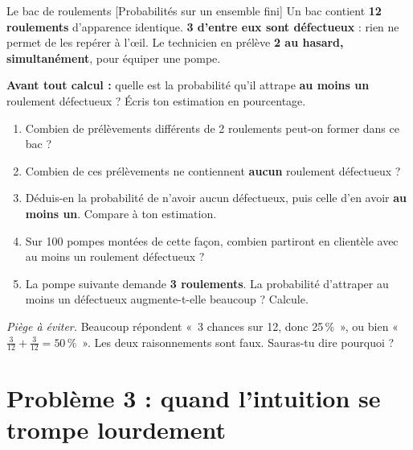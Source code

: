 \documentclass[a4paper,11pt]{article}
\begin{document}
\begin{exo}{Le bac de roulements \hfill \normalfont\color{uimmlightblue}[Probabilités sur un ensemble fini]}
Un bac contient \textbf{12 roulements} d'apparence identique. \textbf{3 d'entre eux sont défectueux} : rien ne permet de les repérer à l'{\oe}il. Le technicien en prélève \textbf{2 au hasard, simultanément}, pour équiper une pompe.

\begin{intuition}
\textbf{Avant tout calcul :} quelle est la probabilité qu'il attrape \textbf{au moins un} roulement défectueux ? Écris ton estimation en pourcentage. \dotfill
\end{intuition}

\begin{enumerate}
  \item Combien de prélèvements différents de 2 roulements peut-on former dans ce bac ?
  \item Combien de ces prélèvements ne contiennent \textbf{aucun} roulement défectueux ?
  \item Déduis-en la probabilité de n'avoir aucun défectueux, puis celle d'en avoir \textbf{au moins un}. Compare à ton estimation.
  \item Sur 100 pompes montées de cette façon, combien partiront en clientèle avec au moins un roulement défectueux ?
  \item La pompe suivante demande \textbf{3 roulements}. La probabilité d'attraper au moins un défectueux augmente-t-elle beaucoup ? Calcule.
\end{enumerate}

\vspace{4pt}
\textit{Piège à éviter.} Beaucoup répondent «~3 chances sur 12, donc 25\,\%~», ou bien «~$\frac{3}{12}+\frac{3}{12}=50\,\%$~». Les deux raisonnements sont faux. Sauras-tu dire pourquoi ?
\end{exo}

\newpage
\section{Problème 3 : quand l'intuition se trompe lourdement}
\end{document}
